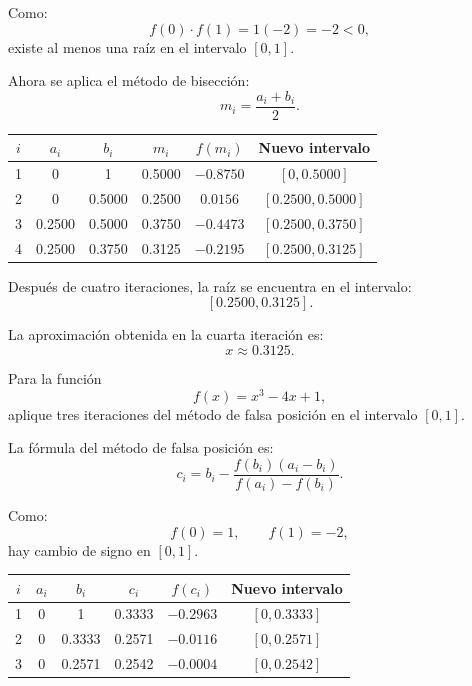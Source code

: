 \documentclass[11pt,respuestas,a4]{aleph-examen}
\begin{document}
\begin{preguntas}
\begin{respuesta}
Como:
\[
f(0)\cdot f(1)=1(-2)=-2<0,
\]
existe al menos una raíz en el intervalo $[0,1]$.

Ahora se aplica el método de bisección:
\[
m_i=\frac{a_i+b_i}{2}.
\]

\begin{center}
\renewcommand{\arraystretch}{1.3}
\begin{tabular}{c|c|c|c|c|c}
\toprule
$i$ & $a_i$ & $b_i$ & $m_i$ & $f(m_i)$ & Nuevo intervalo \\
\midrule
1 & 0 & 1 & 0.5000 & $-0.8750$ & $[0,0.5000]$ \\
2 & 0 & 0.5000 & 0.2500 & $0.0156$ & $[0.2500,0.5000]$ \\
3 & 0.2500 & 0.5000 & 0.3750 & $-0.4473$ & $[0.2500,0.3750]$ \\
4 & 0.2500 & 0.3750 & 0.3125 & $-0.2195$ & $[0.2500,0.3125]$ \\
\bottomrule
\end{tabular}
\end{center}

Después de cuatro iteraciones, la raíz se encuentra en el intervalo:
\[
\boxed{[0.2500,0.3125]}.
\]

La aproximación obtenida en la cuarta iteración es:
\[
\boxed{x\approx 0.3125}.
\]
\end{respuesta}


\item
Para la función 
\[
f(x)=x^3-4x+1,
\]
aplique tres iteraciones del método de falsa posición en el intervalo $[0,1]$.

\begin{respuesta}
La fórmula del método de falsa posición es:
\[
c_i=b_i-\frac{f(b_i)(a_i-b_i)}{f(a_i)-f(b_i)}.
\]

Como:
\[
f(0)=1,\qquad f(1)=-2,
\]
hay cambio de signo en $[0,1]$.

\begin{center}
\renewcommand{\arraystretch}{1.3}
\begin{tabular}{c|c|c|c|c|c}
\toprule
$i$ & $a_i$ & $b_i$ & $c_i$ & $f(c_i)$ & Nuevo intervalo \\
\midrule
1 & 0 & 1 & 0.3333 & $-0.2963$ & $[0,0.3333]$ \\
2 & 0 & 0.3333 & 0.2571 & $-0.0116$ & $[0,0.2571]$ \\
3 & 0 & 0.2571 & 0.2542 & $-0.0004$ & $[0,0.2542]$ \\
\bottomrule
\end{tabular}
\end{center}


\end{respuesta}
\end{preguntas}
\end{document}
